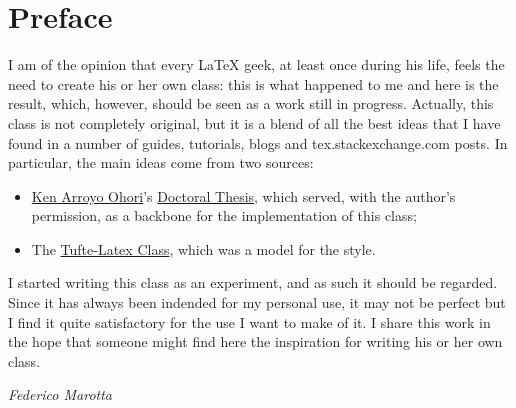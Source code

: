 \chapter*{Preface}

I am of the opinion that every \LaTeX\xspace geek, at least once during 
his life, feels the need to create his or her own class: this is what 
happened to me and here is the result, which, however, should be seen as 
a work still in progress. Actually, this class is not completely 
original, but it is a blend of all the best ideas that I have found in a 
number of guides, tutorials, blogs and tex.stackexchange.com posts. In 
particular, the main ideas come from two sources:

\begin{itemize}
	\item \href{https://3d.bk.tudelft.nl/ken/en/}{Ken Arroyo Ohori}'s 
		\href{ttps://3d.bk.tudelft.nl/ken/en/nl/ken/en/2016/04/17/a-1.5-column-layout-in-latex.html}{Doctoral 
			Thesis}, which served, with the author's permission, as a 
		backbone for the implementation of this class;
	\item The 
		\href{https://github.com/Tufte-LaTeX/tufte-latex}{Tufte-Latex 
			Class}, which was a model for the style.
\end{itemize}

I started writing this class as an experiment, and as such it should be 
regarded. Since it has always been indended for my personal use, it may 
not be perfect but I find it quite satisfactory for the use I want to 
make of it. I share this work in the hope that someone might find here 
the inspiration for writing his or her own class.

\begin{flushright}
	\textit{Federico Marotta}
\end{flushright}
